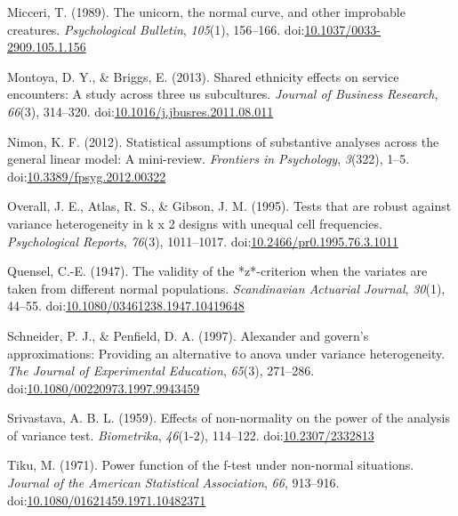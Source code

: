 \documentclass[man,floatsintext]{apa6}
\begin{document}
\leavevmode\hypertarget{ref-Micceri_1989}{}%
Micceri, T. (1989). The unicorn, the normal curve, and other improbable creatures. \emph{Psychological Bulletin}, \emph{105}(1), 156--166. doi:\href{https://doi.org/10.1037/0033-2909.105.1.156}{10.1037/0033-2909.105.1.156}

\leavevmode\hypertarget{ref-Montoya_Briggs_2013}{}%
Montoya, D. Y., \& Briggs, E. (2013). Shared ethnicity effects on service encounters: A study across three us subcultures. \emph{Journal of Business Research}, \emph{66}(3), 314--320. doi:\href{https://doi.org/10.1016/j.jbusres.2011.08.011}{10.1016/j.jbusres.2011.08.011}

\leavevmode\hypertarget{ref-Nimon_2012}{}%
Nimon, K. F. (2012). Statistical assumptions of substantive analyses across the general linear model: A mini-review. \emph{Frontiers in Psychology}, \emph{3}(322), 1--5. doi:\href{https://doi.org/10.3389/fpsyg.2012.00322}{10.3389/fpsyg.2012.00322}

\leavevmode\hypertarget{ref-Overall_et_al_1995}{}%
Overall, J. E., Atlas, R. S., \& Gibson, J. M. (1995). Tests that are robust against variance heterogeneity in k x 2 designs with unequal cell frequencies. \emph{Psychological Reports}, \emph{76}(3), 1011--1017. doi:\href{https://doi.org/10.2466/pr0.1995.76.3.1011}{10.2466/pr0.1995.76.3.1011}

\leavevmode\hypertarget{ref-Quensel_1947}{}%
Quensel, C.-E. (1947). The validity of the *z*-criterion when the variates are taken from different normal populations. \emph{Scandinavian Actuarial Journal}, \emph{30}(1), 44--55. doi:\href{https://doi.org/10.1080/03461238.1947.10419648}{10.1080/03461238.1947.10419648}

\leavevmode\hypertarget{ref-Schneider_and_Penfield_1997}{}%
Schneider, P. J., \& Penfield, D. A. (1997). Alexander and govern's approximations: Providing an alternative to anova under variance heterogeneity. \emph{The Journal of Experimental Education}, \emph{65}(3), 271--286. doi:\href{https://doi.org/10.1080/00220973.1997.9943459}{10.1080/00220973.1997.9943459}

\leavevmode\hypertarget{ref-Srivastava_1959}{}%
Srivastava, A. B. L. (1959). Effects of non-normality on the power of the analysis of variance test. \emph{Biometrika}, \emph{46}(1-2), 114--122. doi:\href{https://doi.org/10.2307/2332813}{10.2307/2332813}

\leavevmode\hypertarget{ref-Tiku_1971}{}%
Tiku, M. (1971). Power function of the f-test under non-normal situations. \emph{Journal of the American Statistical Association}, \emph{66}, 913--916. doi:\href{https://doi.org/10.1080/01621459.1971.10482371}{10.1080/01621459.1971.10482371}
\end{document}
